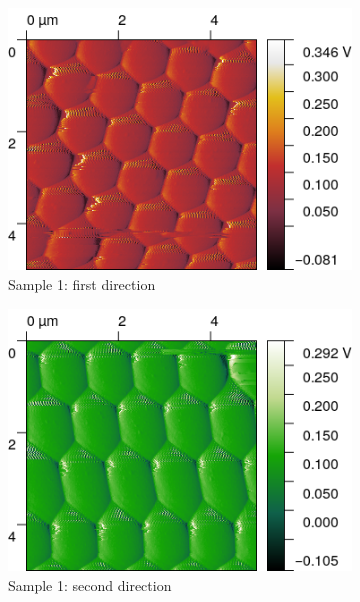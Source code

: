 \documentclass[11pt,a4paper]{article}
\begin{document}
\begin{figure}[H]
\centering
\begin{subfigure}[b]{0.45\textwidth}
\includegraphics[width=\textwidth]{sm_sample1}
\caption{Sample 1: first direction}
\label{fig:}
\end{subfigure}
\begin{subfigure}[b]{0.45\textwidth}
\includegraphics[width=\textwidth]{sm_sample1_dir2}
\caption{Sample 1: second direction}
\label{fig:}
\end{subfigure}\\\vspace{.2cm}
\begin{subfigure}[b]{0.45\textwidth}

\end{subfigure}
\end{figure}
\end{document}

